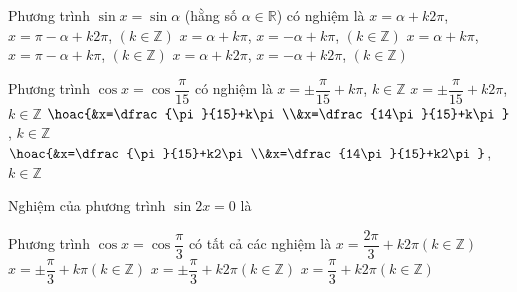 \begin{ex}%
	Phương trình  $\sin x=\sin \alpha$ (hằng số $\alpha \in \mathbb{R}$) có nghiệm là
	 \choice
		{\True $x=\alpha+k2\pi$, $x=\pi-\alpha+k2\pi$, $(k\in  \mathbb{Z})$}
		{$x=\alpha+k\pi$, $x=-\alpha+k\pi$, $(k\in  \mathbb{Z})$}
		{$x=\alpha+k\pi$, $x=\pi-\alpha+k\pi$, $(k\in \mathbb{Z})$} 
		{$x=\alpha+k2\pi$, $x=-\alpha+k2\pi$,  $(k\in \mathbb{Z})$}
\end{ex}

\begin{ex}%
	Phương trình $\cos x=\cos\dfrac{\pi}{15}$ có nghiệm là 
	\choice 
		{$x=\pm\dfrac{\pi}{15}+k\pi$,  $k\in\mathbb{Z}$}
		{\True $x=\pm \dfrac{\pi}{15}+k2\pi$, $k\in\mathbb{Z}$} 
		{$\hoac{&x=\dfrac{\pi}{15}+k\pi\\&x=\dfrac{14\pi}{15}+k\pi}$, $k\in\mathbb{Z}$} 
		{$\hoac{&x=\dfrac{\pi}{15}+k2\pi\\&x=\dfrac{14\pi}{15}+k2\pi}$, $k\in\mathbb{Z}$} 
\end{ex}

\begin{ex}%
	Nghiệm của phương trình $\sin2x=0$ là 
\end{ex}

\begin{ex}%
	Phương trình $\cos x=\cos \dfrac{\pi}{3}$ có tất cả các nghiệm  là
	 \choice
		{ $ x=\dfrac{2\pi}{3}+k2\pi \left(k\in  \mathbb{Z}\right)$}
		{ $ x=\pm \dfrac{\pi}{3}+k\pi  \left(k\in \mathbb{Z}\right)$}
		{\True $ x=\pm \dfrac{\pi}{3}+k2\pi  \left(k\in \mathbb{Z}\right)$}
		 { $ x=\dfrac{\pi}{3}+k2\pi \left(k\in \mathbb{Z}\right)$}
\end{ex}

